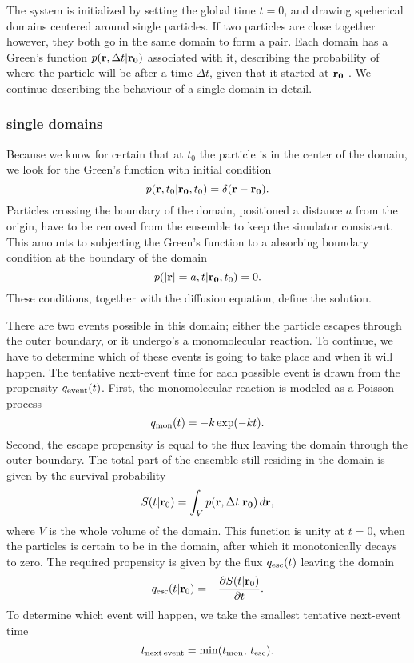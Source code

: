The system is initialized by setting the global time $t=0$, and drawing speherical domains centered around single particles. If two particles are close together however, they both go in the same domain to form a pair. Each domain has a Green's function $p({\bf r}, \Delta t|{\bf r_0})$ associated with it, describing the probability of where the particle will be after a time $\Delta t$, given that it started at ${\bf r_0}$ \cite{Carslaw1959}. We continue describing the behaviour of a single-domain in detail.

\subsubsection{single domains}
Because we know for certain that at $t_0$ the particle is in the center of the domain, we look for the Green's function with initial condition
\begin{equation}
 p({\bf r}, t_0|{\bf r_0},t_0) = \delta(\mathbf{r - r_0}).
\end{equation}
Particles crossing the boundary of the domain, positioned a distance $a$ from the origin, have to be removed from the ensemble to keep the simulator consistent. This amounts to subjecting the Green's function to a absorbing boundary condition at the boundary of the domain
\begin{equation}
 p({\bf |r|}=a, t|{\bf r_0},t_0) = 0.
\end{equation}
These conditions, together with the diffusion equation, define the solution. \cite{Carslaw1959}\cite{Beck1992} 

There are two events possible in this domain; either the particle escapes through the outer boundary, or it undergo's a monomolecular reaction. To continue, we have to determine which of these events is going to take place and when it will happen. The tentative next-event time for each possible event is drawn from the propensity $q_{\rm event}(t)$. First, the monomolecular reaction is modeled as a Poisson process
\begin{equation}
 q_{\rm mon}(t) = -k\, {\rm exp}(-k t).
\end{equation}
Second, the escape propensity is equal to the flux leaving the domain through the outer boundary. 
The total part of the ensemble still residing in the domain is given by the survival probability
\begin{equation}
 S(t|{\mathbf r_0}) = \int_V p({\bf r}, \Delta t|{\bf r_0}) \, d{\mathbf r},
 \elabel{Surv}
\end{equation}
where $V$ is the whole volume of the domain. This function is unity at $t=0$, when the particles is certain to be in the domain, after which it monotonically decays to zero. The required propensity is given by the flux $q_{\rm esc}(t)$ leaving the domain
\begin{equation}
 q_{\rm esc}(t|{\mathbf r_0}) = -\pdiff{S(t|{\mathbf r_0})}{t}.
 \elabel{Sflux}
\end{equation}
To determine which event will happen, we take the smallest tentative next-event time
\begin{equation}
 t_{\rm next\,event} = {\rm min}(t_{\rm mon},\,t_{\rm esc}).
\end{equation}

